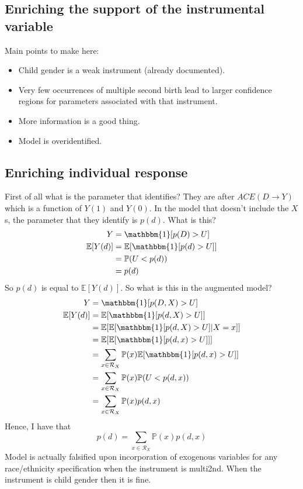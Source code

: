 \documentclass[10pt,a4paper,twoside]{article}
\numberwithin{equation}{section}
\begin{document}
\subsection{Enriching the support of the instrumental variable}
Main points to make here:
\begin{itemize}
\item Child gender is a weak instrument (already documented).
\item Very few occurrences of multiple second birth lead to larger confidence regions for parameters associated with that instrument.
\item More information is a good thing.
\item Model is overidentified.
\end{itemize}
\subsection{Enriching individual response}
First of all what is the parameter that \cite{cr13} identifies? They are after $ACE(D\rightarrow Y)$ which is a function of $Y(1)$ and $Y(0)$. In the model that doesn't include the $X$s, the parameter that they identify is $p(d)$. What is this?
\begin{align*}
Y&=\mathbbm{1}[p(D)>U]\\
\mathbb{E}[Y(d)]&=\mathbb{E}[\mathbbm{1}[p(d)>U]]\\
&=\mathbb{P}(U<p(d))\\
&=p(d)
\end{align*} 
So $p(d)$ is equal to $\mathbb{E}[Y(d)]$. So what is this in the augmented model?
\begin{align*}
Y&=\mathbbm{1}[p(D,X)>U]\\
\mathbb{E}[Y(d)]&=\mathbb{E}[\mathbbm{1}[p(d,X)>U]]\\
&=\mathbb{E}[\mathbb{E}[\mathbbm{1}[p(d,X)>U]|X=x]]\\
&=\mathbb{E}[\mathbb{E}[\mathbbm{1}[p(d,x)>U]]]\\
&=\sum_{x\in\mathcal{R}_X}\mathbb{P}(x)\mathbb{E}[\mathbbm{1}[p(d,x)>U]]\\
&=\sum_{x\in\mathcal{R}_X}\mathbb{P}(x)\mathbb{P}(U<p(d,x))\\
&=\sum_{x\in\mathcal{R}_X}\mathbb{P}(x)p(d,x)
\end{align*} 
Hence, I have that
\[p(d)=\sum_{x\in\mathcal{R}_X}\mathbb{P}(x)p(d,x)\]
Model is actually falsified upon incorporation of exogenous variables for any race/ethnicity specification when the instrument is multi2nd. When the instrument is child gender then it is fine.
\end{document}
